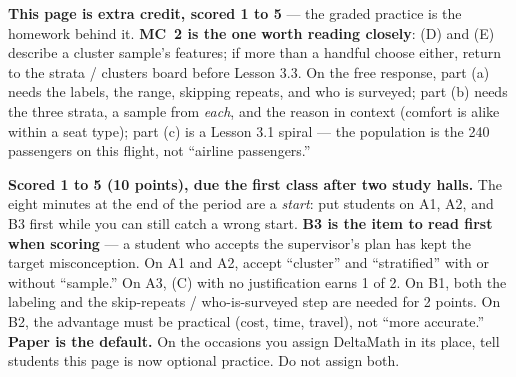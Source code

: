 \documentclass[10pt]{article}
\begin{document}
\begin{teachernote}[AP Practice]
\textbf{This page is extra credit, scored 1 to 5} --- the graded practice is the homework
behind it. \textbf{MC~2 is the one worth reading closely}: (D) and (E) describe a cluster
sample's features; if more than a handful choose either, return to the strata / clusters board
before Lesson 3.3. On the free response, part (a) needs the labels, the range, skipping
repeats, and who is surveyed; part (b) needs the three strata, a sample from \emph{each}, and
the reason in context (comfort is alike within a seat type); part (c) is a Lesson 3.1 spiral ---
the population is the 240 passengers on this flight, not ``airline passengers.''
\end{teachernote}

\begin{teachernote}[Homework]
\textbf{Scored 1 to 5 (10 points), due the first class after two study halls.} The eight
minutes at the end of the period are a \emph{start}: put students on A1, A2, and B3 first while
you can still catch a wrong start. \textbf{B3 is the item to read first when scoring} --- a
student who accepts the supervisor's plan has kept the target misconception. On A1 and A2,
accept ``cluster'' and ``stratified'' with or without ``sample.'' On A3, (C) with no
justification earns 1 of 2. On B1, both the labeling and the skip-repeats / who-is-surveyed
step are needed for 2 points. On B2, the advantage must be practical (cost, time, travel), not
``more accurate.'' \textbf{Paper is the default.} On the occasions you assign DeltaMath in its
place, tell students this page is now optional practice. Do not assign both.
\end{teachernote}
\end{document}
